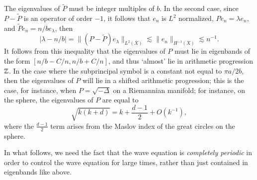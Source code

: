 The eigenvalues of $\tilde{P}$ must be integer multiples of $b$. In the second case, since $P - \tilde{P}$ is an operator of order $-1$, it follows that $e_n$ is $L^2$ normalized, $P e_n = \lambda e_n$, and $\tilde{P} e_n = n / b e_\lambda$, then
%
\[ |\lambda - n / b| = \| (P - \tilde{P}) e_\lambda \|_{L^2(X)} \lesssim \| e_n \|_{H^{-1}(X)} \lesssim n^{-1}. \]
%
It follows from this inequality that the eigenvalues of $P$ must lie in eigenbands of the form $[n/b - C/n, n/b + C/n]$, and thus `almost' lie in arithmetic progression $\operatorname{\mathbb{Z}}$. In the case where the subprincipal symbol is a constant not equal to $\pi a / 2b$, then the eigenvalues of $P$ will lie in a shifted arithmetic progression; this is the case, for instance, when $P = \sqrt{-\Delta}$ on a Riemannian manifold; for instance, on the sphere, the eigenvalues of $P$ are equal to
%
\begin{equation}
  \sqrt{k(k+d)} = k + \frac{d-1}{2} + O(k^{-1}),
\end{equation}
%
where the $\tfrac{d-1}{2}$ term arises from the Maslov index of the great circles on the sphere.

In what follows, we need the fact that the wave equation is \emph{completely periodic} in order to control the wave equation for large times, rather than just contained in eigenbands like above.